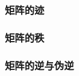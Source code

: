 \documentclass[lang=cn,10pt]{gorgeousnbook}
\numberwithin{equation}{section}%
\numberwithin{figure}{section}%
\begin{document}
\subsubsection{矩阵的迹}

\subsubsection{矩阵的秩}

\subsubsection{矩阵的逆与伪逆}




\end{document}
